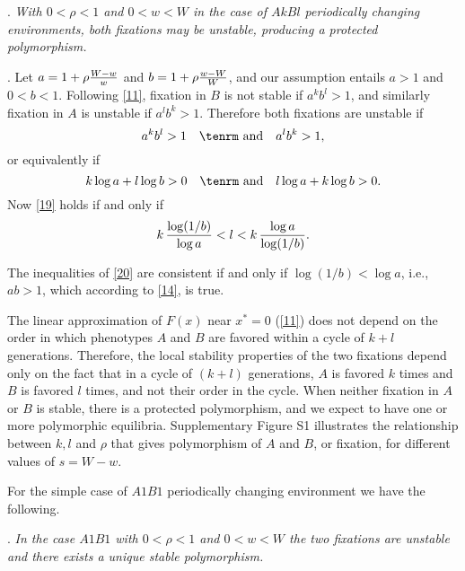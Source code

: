 \documentclass[9pt,twocolumn,twoside,lineno]{pnas-new}
\begin{document}
. {\sl With $0<\rho<1$ and $0<w<W$ in the case of $AkBl$ periodically changing environments, both fixations may be unstable, producing a protected polymorphism.}\par
\medskip

. Let $a=1+\rho{W-w\over w}$ and $b=1+\rho{w-W\over W}$, and our assumption entails  $a>1$ and $0<b<1$. Following \eqref{11}, fixation in $B$ is not stable if $a^kb^l>1$, and similarly  fixation in $A$ is unstable if $a^lb^k>1$. Therefore both fixations are unstable if
\begin{equation}a^kb^l>1\quad\hbox{\tenrm and}\quad a^lb^k>1,\label{18}\end{equation}
or equivalently if
\begin{equation}k\log a +l\log b>0\quad\hbox{\tenrm and}\quad l\log a+k\log b>0.\label{19}\end{equation}
Now \eqref{19} holds if and only if
\begin{equation}k\,{\log(1/b)\over\log a} < l < k\,{\log a\over\log(1/b)}.\label{20}\end{equation} 

The inequalities of \eqref{20} are consistent if and only if $\log(1/b)<\log a$, i.e., $ab>1$, which according to \eqref{14}, is true.

The linear approximation of $F(x)$ near $x^*=0$ (\eqref{11}) does not depend on the order in which phenotypes $A$ and $B$ are favored within a cycle of $k+l$ generations.
Therefore, the local stability properties of the two fixations depend only on the fact that in a cycle of $(k+l)$ generations, $A$ is favored $k$ times and $B$ is favored $l$ times, and not their order in the cycle. 
When neither fixation in $A$ or $B$ is stable, there is a protected polymorphism, and we expect to have one or more polymorphic equilibria. Supplementary Figure S1 illustrates the relationship between $k,l$ and $\rho$ that gives polymorphism of $A$ and $B$, or fixation, for different values of $s=W-w$. 

For the simple case of $A1B1$ periodically changing environment we have the following.
\medskip

. {\sl In the case $A1B1$ with $0<\rho<1$ and $0<w<W$ the two fixations are unstable and there exists a unique stable polymorphism.}\par
\medskip
\end{document}
